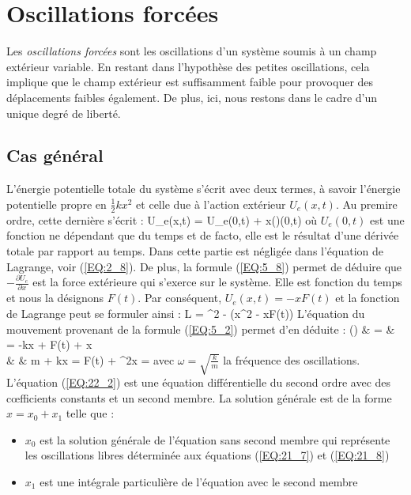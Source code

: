 \section{Oscillations forc\'ees}

Les \emph{oscillations forc\'ees} sont les oscillations d'un syst\`eme soumis \`a un champ ext\'erieur variable. En restant dans l'hypoth\`ese des petites oscillations, cela implique que le champ ext\'erieur est suffisamment faible pour provoquer des d\'eplacements faibles \'egalement. De plus, ici, nous restons dans le cadre d'un unique degr\'e de libert\'e.

\subsection{Cas g\'en\'eral}

L'\'energie potentielle totale du syst\`eme s'\'ecrit avec deux termes, \`a savoir l'\'energie potentielle propre en $\frac{1}{2}kx^{2}$ et celle due \`a l'action ext\'erieur $U_{e}(x,t)$. Au premire ordre, cette derni\`ere s'\'ecrit :
\benn
	U_{e}(x,t) = U_{e}(0,t) + x\left(\right)(0,t)
\eenn
o\`u $U_{e}(0,t)$ est une fonction ne d\'ependant que du temps et de facto, elle est le r\'esultat d'une d\'eriv\'ee totale par rapport au temps. Dans cette partie est n\'eglig\'ee dans l'\'equation de Lagrange, voir (\ref{EQ:2_8}). De plus, la formule (\ref{EQ:5_8}) permet de d\'eduire que $-\frac{\partial U_{e}}{\partial x}$ est la force ext\'erieure qui s'exerce sur le syst\`eme. Elle est fonction du temps et nous la d\'esignons $F(t)$. Par cons\'equent, $U_{e}(x,t) = -xF(t)$ et la fonction de Lagrange peut se formuler ainsi :
\be
	L = ^{2} - \left(x^{2} - xF(t)\right) \label{EQ:22_1}
\ee
L'\'equation du mouvement provenant de la formule (\ref{EQ:5_2}) permet d'en d\'eduite :
\bea
	\left(\right) & = &  \Leftrightarrow {} = -kx + F(t) + x \nonumber \\
	& \Leftrightarrow & m + kx = F(t) \Leftrightarrow {} + \omega^{2}x =  \label{EQ:22_2}
\eea
avec $\omega = \sqrt{\frac{k}{m}}$ la fr\'equence des oscillations. L'\'equation (\ref{EQ:22_2}) est une \'equation diff\'erentielle du second ordre avec des c{\oe}fficients constants et un second membre. La solution g\'en\'erale est de la forme $x = x_{0} + x_{1}$ telle que :
\begin{itemize}
	\item $x_{0}$ est la solution g\'en\'erale de l'\'equation sans second membre qui repr\'esente les oscillations libres d\'etermin\'ee aux \'equations (\ref{EQ:21_7}) et (\ref{EQ:21_8})
	\item $x_{1}$ est une int\'egrale particuli\`ere de l'\'equation avec le second membre
\end{itemize}

